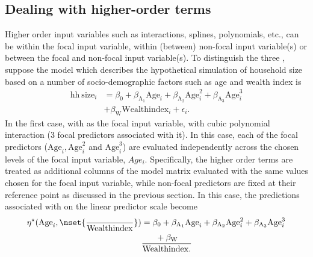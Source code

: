 \subsection{Dealing with higher-order terms}


Higher order input variables such as interactions, splines, polynomials, etc., can be within the focal input variable, within (between) non-focal input variable(s) or between the focal and non-focal input variable(s). To distinguish the three , suppose the model which describes the hypothetical simulation of household size based on a number of socio-demographic factors such as age and wealth index is
%
\begin{align}\label{eq:lm_cubic}
\mathrm{hh~size}_i &= \beta_0 + \beta_{\mathrm{A_1}}\mathrm{Age}_i + \beta_{\mathrm{A_2}}\mathrm{Age}^2_i + \beta_{\mathrm{A_3}}\mathrm{Age}^3_i\nonumber \\
&+ \beta_{\mathrm{W}}\mathrm{Wealthindex}_i + \epsilon_i.
\end{align}
%
In the first case, with  as the focal input variable, with cubic polynomial interaction ($3$ focal predictors associated with it). In this case, each of the focal predictors ($\mathrm{Age}_i, \mathrm{Age}^2_i$ and $\mathrm{Age}^3_i$) are evaluated independently across the chosen levels of the focal input variable, $Age_i$. Specifically, the higher order terms are treated as additional columns of the model matrix evaluated with the same values chosen for the focal input variable, while non-focal predictors are fixed at their reference point as discussed in the previous section. In this case, the predictions associated with  on the linear predictor scale become
%
\begin{align}
\eta^\star(\mathrm{Age}_i, \nset{{\over{\mathrm{Wealthindex}}}}) &= \beta_0 + \beta_{\mathrm{A_1}}\mathrm{Age}_i + \beta_{\mathrm{A_2}}\mathrm{Age}^2_i + \beta_{\mathrm{A_3}}\mathrm{Age}^3_i \nonumber\\
	& + \beta_{\mathrm{W}}\over{\mathrm{Wealthindex}}.
\end{align}
